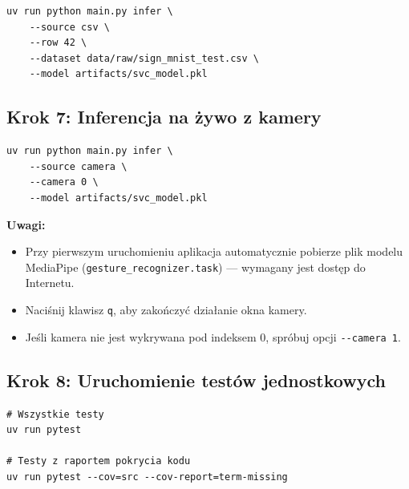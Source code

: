 \begin{lstlisting}[style=styleBash, numbers=none, caption={Inferencja na wybranym wierszu pliku CSV}, label=lst:infer-csv]
uv run python main.py infer \
    --source csv \
    --row 42 \
    --dataset data/raw/sign_mnist_test.csv \
    --model artifacts/svc_model.pkl
\end{lstlisting}

\newpage
\subsection*{Krok 7: Inferencja na żywo z kamery}

\begin{lstlisting}[style=styleBash, numbers=none, caption={Uruchomienie inferencji w czasie rzeczywistym}, label=lst:infer-live]
uv run python main.py infer \
    --source camera \
    --camera 0 \
    --model artifacts/svc_model.pkl
\end{lstlisting}

\textbf{Uwagi:}
\begin{itemize}
    \item Przy pierwszym uruchomieniu aplikacja automatycznie pobierze plik
          modelu MediaPipe (\texttt{gesture\_recognizer.task}) --- wymagany
          jest dostęp do Internetu.
    \item Naciśnij klawisz \texttt{q}, aby zakończyć działanie okna kamery.
    \item Jeśli kamera nie jest wykrywana pod indeksem 0, spróbuj
          opcji \texttt{-{}-camera 1}.
\end{itemize}

\subsection*{Krok 8: Uruchomienie testów jednostkowych}

\begin{lstlisting}[style=styleBash, numbers=none, caption={Uruchamianie testów pytest}, label=lst:tests]
# Wszystkie testy
uv run pytest

# Testy z raportem pokrycia kodu
uv run pytest --cov=src --cov-report=term-missing
\end{lstlisting}

